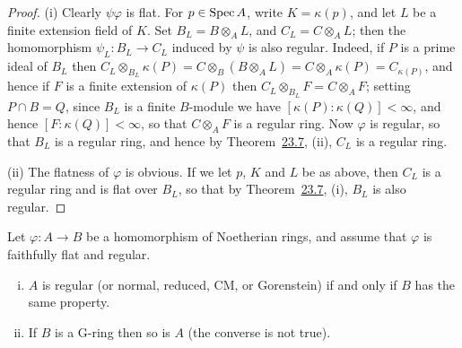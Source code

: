 \begin{proof}
(i) Clearly $\psi\varphi$ is flat. For $p \in \operatorname{Spec} A$, write $K = \kappa(p)$, and let $L$ be a
finite extension field of $K$. Set $B_L = B \otimes_A L$, and $C_L = C \otimes_A L$; then the
homomorphism $\psi_L\colon B_L \to C_L$ induced by $\psi$ is also regular. Indeed, if $P$ is a
prime ideal of $B_L$ then $C_L \otimes_{B_L} \kappa(P) = C \otimes_B (B \otimes_A L) = C \otimes_A
\kappa(P) = C_{\kappa(P)}$, and hence if $F$ is a finite extension of $\kappa(P)$ then
$C_L \otimes_{B_L} F = C \otimes_A F$; setting $P \cap B = Q$, since $B_L$ is a finite $B$-module we
have $[\kappa(P) : \kappa(Q)] < \infty$, and hence $[F : \kappa(Q)] < \infty$, so that
$C \otimes_A F$ is a regular ring. Now $\varphi$ is regular, so that $B_L$ is a regular ring,
and hence by Theorem~\hyperref[thm:23.7]{23.7}, (ii), $C_L$ is a regular ring.

(ii) The flatness of $\varphi$ is obvious. If we let $p$, $K$ and $L$ be as above, then
$C_L$ is a regular ring and is flat over $B_L$, so that by Theorem~\hyperref[thm:23.7]{23.7}, (i), $B_L$
is also regular.
\end{proof}

\begin{theorem}\label{thm:32.2}
Let $\varphi\colon A \to B$ be a homomorphism of Noetherian rings, and assume that
$\varphi$ is faithfully flat and regular.
\begin{enumerate}[(i)]
  \item $A$ is regular (or normal, reduced, CM, or Gorenstein) if and only if $B$ has
        the same property.
  \item If $B$ is a G-ring then so is $A$ (the converse is not true).
\end{enumerate}
\end{theorem}

